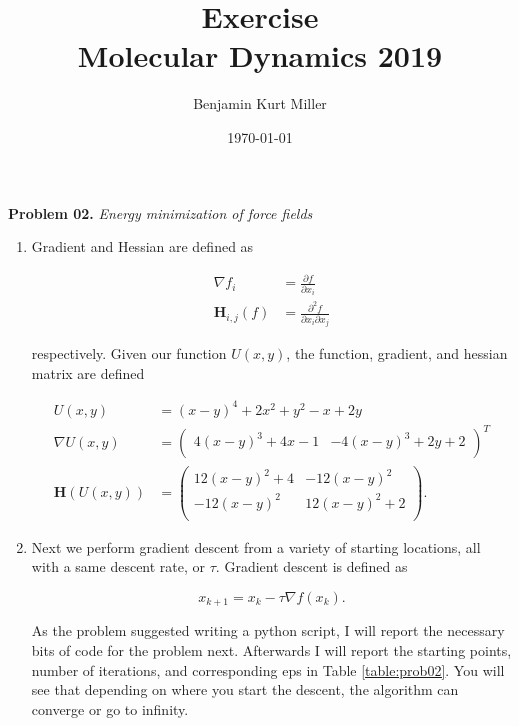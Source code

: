 \documentclass{article}
\title{Exercise \exnum \\ 
    Molecular Dynamics 2019}
\author{Benjamin Kurt Miller}
\date{\today}
\newcommand{\exnum}{02} %
\newcounter{problem}[section]
\newenvironment{prob}[1]
{
    \refstepcounter{problem}
    \Large{\textbf{Problem \exnum.\theproblem}  \qquad \textit{#1}}
    \begin{enumerate}[label=\alph*]
    \normalsize
}{
    \end{enumerate}
}
\begin{document}
\maketitle


\begin{prob}{Energy minimization of force fields}
\item Gradient and Hessian are defined as 

\begin{align*}
    \nabla f_{i} &= \frac{\partial f}{\partial x_{i}} \\
    \mathbf{H}_{i,j}(f) &= \frac{\partial^{2} f}{\partial x_{i} \partial x_{j}}
\end{align*}

respectively. Given our function $U(x, y)$, the function, gradient, and hessian matrix are defined

\begin{align}
    U(x,y) &= (x - y)^{4} + 2x^{2} + y^{2} - x + 2y \\
    \nabla U(x,y) &=
    \begin{pmatrix}
        4(x-y)^{3} + 4x - 1 & -4(x-y)^{3} + 2y + 2 \\
    \end{pmatrix}^{T} \\
    \mathbf{H}(U(x,y)) &= 
    \begin{pmatrix}
        12(x-y)^{2} + 4 & -12(x-y)^{2} \\
        -12(x-y)^{2} & 12(x-y)^{2} + 2 \\
    \end{pmatrix}.
\end{align}

\item 

Next we perform gradient descent from a variety of starting locations, all with a same descent rate, or $\tau$. Gradient descent is defined as 

\begin{equation}
	x_{k+1} = x_{k} - \tau \nabla f(x_{k}).
\end{equation}

As the problem suggested writing a python script, I will report the necessary bits of code for the problem next. Afterwards I will report the starting points, number of iterations, and corresponding eps in Table \ref{table:prob02}. You will see that depending on where you start the descent, the algorithm can converge or go to infinity.

\begin{lstlisting}[frame=single]  % Start your code-block


\end{lstlisting}
\end{prob}
\end{document}
